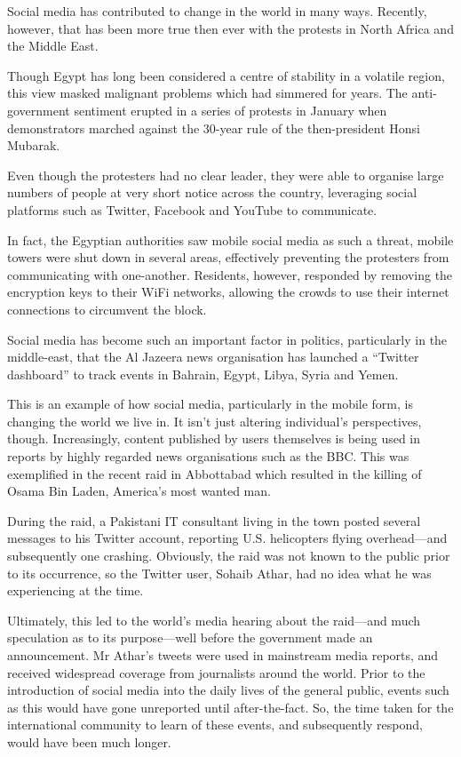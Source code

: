 \documentclass[a4paper,11pt]{article}
\begin{document}
    Social media has contributed to change in the world in many ways. Recently,
    however, that has been more true then ever with the protests in North
    Africa and the Middle East.

    Though Egypt has long been considered a centre of stability in a volatile
    region, this view masked malignant problems which had simmered for years.
    The anti-government sentiment erupted in a series of protests in January
    when demonstrators marched against the 30-year rule of the then-president
    Honsi Mubarak.

    Even though the protesters had no clear leader, they were able to organise
    large numbers of people at very short notice across the country, leveraging
    social platforms such as Twitter, Facebook and YouTube to communicate.

    In fact, the Egyptian authorities saw mobile social media as such a threat,
    mobile towers were shut down in several areas, effectively preventing the
    protesters from communicating with one-another. Residents, however,
    responded by removing the encryption keys to their WiFi networks, allowing
    the crowds to use their internet connections to circumvent the block.

    Social media has become such an important factor in politics, particularly
    in the middle-east, that the Al Jazeera news organisation has launched
    a ``Twitter dashboard'' to track events in Bahrain, Egypt, Libya, Syria and
    Yemen.

    This is an example of how social media, particularly in the mobile form, is
    changing the world we live in. It isn't just altering individual's
    perspectives, though. Increasingly, content published by users themselves
    is being used in reports by highly regarded news organisations such as the
    BBC. This was exemplified in the recent raid in Abbottabad which resulted
    in the killing of Osama Bin Laden, America's most wanted man.

    During the raid, a Pakistani IT consultant living in the town posted
    several messages to his Twitter account, reporting U.S. helicopters flying
    overhead---and subsequently one crashing. Obviously, the raid was not known
    to the public prior to its occurrence, so the Twitter user, Sohaib Athar,
    had no idea what he was experiencing at the time.

    Ultimately, this led to the world's media hearing about the raid---and much
    speculation as to its purpose---well before the government made an
    announcement. Mr Athar's tweets were used in mainstream media reports, and
    received widespread coverage from journalists around the world. Prior to
    the introduction of social media into the daily lives of the general
    public, events such as this would have gone unreported until
    after-the-fact. So, the time taken for the international community to learn
    of these events, and subsequently respond, would have been much longer.
\end{document}
